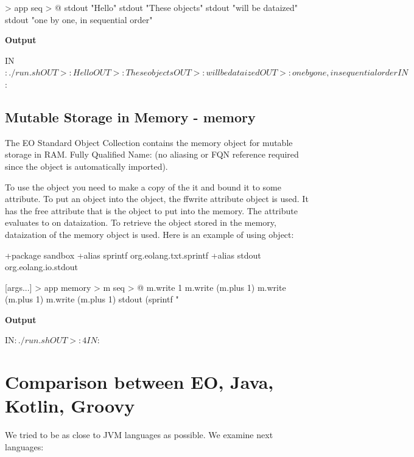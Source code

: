 \documentclass[12pt]{book}
\begin{document}
{{{\begin{ffcode}
[args...] > app
  seq > @
    stdout "Hello\n"
    stdout "These objects\n"
    stdout "will be dataized\n"
    stdout "one by one, in sequential order\n"
\end{ffcode}
\textbf{Output}
\begin{ffcode}
IN$: ./run.sh
OUT>: Hello
OUT>: These objects
OUT>: will be dataized
OUT>: one by one, in sequential order
IN$: 
\end{ffcode}

\section{Mutable Storage in Memory - memory}
The EO Standard Object Collection contains the memory object for mutable storage in RAM.
Fully Qualified Name:  (no aliasing or FQN reference required since the object is automatically imported).

To use the  object you need to make a copy of the it and bound it to some attribute.
To put an object into the  object, the 
ff{write} attribute object is used. It has the  free attribute that is the object to put into the memory. The  attribute evaluates to  on dataization.
To retrieve the object stored in the memory, dataization of the memory object is used. Here is an example of using  object:

\begin{ffcode}
+package sandbox
+alias sprintf org.eolang.txt.sprintf
+alias stdout org.eolang.io.stdout

[args...] > app
  memory > m
  seq > @
    m.write 1
    m.write (m.plus 1)
    m.write (m.plus 1)
    m.write (m.plus 1)
    stdout (sprintf "%
\end{ffcode}
\textbf{Output}
\begin{ffcode}
IN$: ./run.sh
OUT>: 4
IN$: 
\end{ffcode}


\chapter{Comparison between EO, Java, Kotlin, Groovy}
We tried to be as close to JVM languages as possible.
We examine next languages:

}}}
\end{document}
